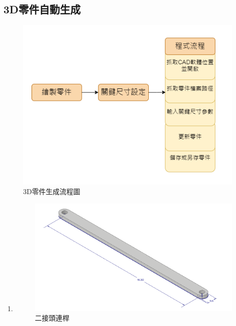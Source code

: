 \documentclass[14pt,a4paper]{report}  %
\newcommand{\fourteen}{\fontsize{14pt}{\baselineskip}\selectfont}%
\begin{document}
{    	\subsection{3D零件自動生成}
	\begin{flushleft}
	\fourteen {完成機構設計後接著就要進入CAD階段，不過在此階段常面臨突然遇到有其他的因素導致需要修改尺寸，此時若以手動將一個個零件一一重新修改會浪費許多時間，因此本專題建立一程式流程來進行參數化修改。}
	\end{flushleft}
	\begin{figure}[hbt!]
        \centering
        \includegraphics[scale=0.6]{3D零件生成.png}
        \caption{3D零件生成流程圖}
        \label{fig_3Dparts:scale}
    \end{figure}
    
	
	\newpage
	\begin{enumerate}
	\item{
	\fourteen{繪製零件:建立後續會用到的零件}
	\begin{figure}[hbt!]
        \centering
        \includegraphics[scale=0.4]{binary_link.png}
        \caption{二接頭連桿}
        \label{fig_binary_link:scale}
        

\end{figure}}
\end{enumerate}}
\end{document}

